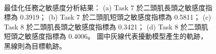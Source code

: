 \bigskip
\begin{figure}[!ht]
	\centering
     \\  
    \caption[最佳化任務之敏感度分析結果]{最佳化任務之敏感度分析結果：
                                       (a) Task 7 於二頭肌長頭之敏感度指標為 0.3919；
                                       (b) Task 7 於二頭肌短頭之敏感度指標為 0.5811；
                                       (c) Task 8 於二頭肌長頭之敏感度指標為 0.3421；
                                       (d) Task 8 於二頭肌短頭之敏感度指標為 0.4006。
                                       圖中灰線代表擾動模型產生的軌跡，黑線則為目標軌跡。}
    \label{ch4_fig_SAResults_Opt}
\end{figure}


